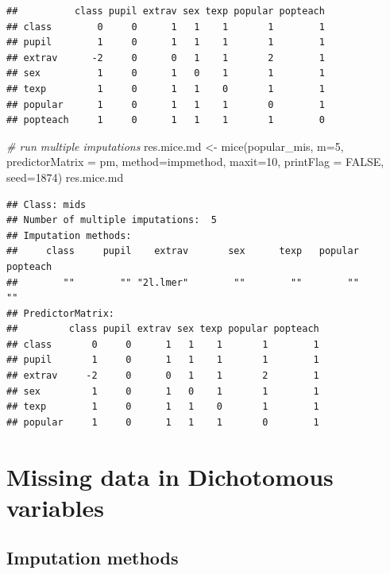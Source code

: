 \documentclass[
]{book}
\newenvironment{Shaded}{\begin{snugshade}}{\end{snugshade}}
\newcommand{\AttributeTok}[1]{\textcolor[rgb]{0.77,0.63,0.00}{#1}}
\newcommand{\CommentTok}[1]{\textcolor[rgb]{0.56,0.35,0.01}{\textit{#1}}}
\newcommand{\ConstantTok}[1]{\textcolor[rgb]{0.00,0.00,0.00}{#1}}
\newcommand{\DecValTok}[1]{\textcolor[rgb]{0.00,0.00,0.81}{#1}}
\newcommand{\FunctionTok}[1]{\textcolor[rgb]{0.00,0.00,0.00}{#1}}
\newcommand{\NormalTok}[1]{#1}
\newcommand{\OtherTok}[1]{\textcolor[rgb]{0.56,0.35,0.01}{#1}}
\begin{document}
\begin{verbatim}
##          class pupil extrav sex texp popular popteach
## class        0     0      1   1    1       1        1
## pupil        1     0      1   1    1       1        1
## extrav      -2     0      0   1    1       2        1
## sex          1     0      1   0    1       1        1
## texp         1     0      1   1    0       1        1
## popular      1     0      1   1    1       0        1
## popteach     1     0      1   1    1       1        0
\end{verbatim}

\begin{Shaded}
\begin{Highlighting}[]
\CommentTok{\# run multiple imputations}
\NormalTok{res.mice.md }\OtherTok{\textless{}{-}} \FunctionTok{mice}\NormalTok{(popular\_mis, }\AttributeTok{m=}\DecValTok{5}\NormalTok{, }\AttributeTok{predictorMatrix =}\NormalTok{ pm,}
                    \AttributeTok{method=}\NormalTok{impmethod, }\AttributeTok{maxit=}\DecValTok{10}\NormalTok{, }\AttributeTok{printFlag =} \ConstantTok{FALSE}\NormalTok{, }\AttributeTok{seed=}\DecValTok{1874}\NormalTok{)}
\NormalTok{res.mice.md}
\end{Highlighting}
\end{Shaded}

\begin{verbatim}
## Class: mids
## Number of multiple imputations:  5 
## Imputation methods:
##     class     pupil    extrav       sex      texp   popular  popteach 
##        ""        "" "2l.lmer"        ""        ""        ""        "" 
## PredictorMatrix:
##         class pupil extrav sex texp popular popteach
## class       0     0      1   1    1       1        1
## pupil       1     0      1   1    1       1        1
## extrav     -2     0      0   1    1       2        1
## sex         1     0      1   0    1       1        1
## texp        1     0      1   1    0       1        1
## popular     1     0      1   1    1       0        1
\end{verbatim}

\hypertarget{missing-data-in-dichotomous-variables}{%
\section{Missing data in Dichotomous variables}\label{missing-data-in-dichotomous-variables}}

\hypertarget{imputation-methods-1}{%
\subsection{Imputation methods}\label{imputation-methods-1}}
\end{document}
